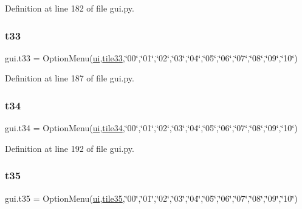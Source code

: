 Definition at line 182 of file gui.\+py.

\mbox{\label{namespacegui_aef107f0e9e821704a733d1ac03809acd}} 
\subsubsection{\texorpdfstring{t33}{t33}}
{\footnotesize\ttfamily gui.\+t33 = Option\+Menu(\mbox{\hyperlink{namespacegui_a40ab7281456eadbea2dc2038f5c24fa1}{ui}},\mbox{\hyperlink{namespacegui_aa338802b7dcd13afe3034f0bd6b4ac4e}{tile33}},\char`\"{}00\char`\"{},\char`\"{}01\char`\"{},\char`\"{}02\char`\"{},\char`\"{}03\char`\"{},\char`\"{}04\char`\"{},\char`\"{}05\char`\"{},\char`\"{}06\char`\"{},\char`\"{}07\char`\"{},\char`\"{}08\char`\"{},\char`\"{}09\char`\"{},\char`\"{}10\char`\"{})}



Definition at line 187 of file gui.\+py.

\mbox{\label{namespacegui_a6dd7a7ae3f8df7267d965e3642251137}} 
\subsubsection{\texorpdfstring{t34}{t34}}
{\footnotesize\ttfamily gui.\+t34 = Option\+Menu(\mbox{\hyperlink{namespacegui_a40ab7281456eadbea2dc2038f5c24fa1}{ui}},\mbox{\hyperlink{namespacegui_a4f827dfac57ca6256640fa244ffa1453}{tile34}},\char`\"{}00\char`\"{},\char`\"{}01\char`\"{},\char`\"{}02\char`\"{},\char`\"{}03\char`\"{},\char`\"{}04\char`\"{},\char`\"{}05\char`\"{},\char`\"{}06\char`\"{},\char`\"{}07\char`\"{},\char`\"{}08\char`\"{},\char`\"{}09\char`\"{},\char`\"{}10\char`\"{})}



Definition at line 192 of file gui.\+py.

\mbox{\label{namespacegui_ad633cf87dc68dca3c96ab4d2ab83ac6b}} 
\subsubsection{\texorpdfstring{t35}{t35}}
{\footnotesize\ttfamily gui.\+t35 = Option\+Menu(\mbox{\hyperlink{namespacegui_a40ab7281456eadbea2dc2038f5c24fa1}{ui}},\mbox{\hyperlink{namespacegui_a890f018d64e439ac53ae9d4a3db07d11}{tile35}},\char`\"{}00\char`\"{},\char`\"{}01\char`\"{},\char`\"{}02\char`\"{},\char`\"{}03\char`\"{},\char`\"{}04\char`\"{},\char`\"{}05\char`\"{},\char`\"{}06\char`\"{},\char`\"{}07\char`\"{},\char`\"{}08\char`\"{},\char`\"{}09\char`\"{},\char`\"{}10\char`\"{})}



